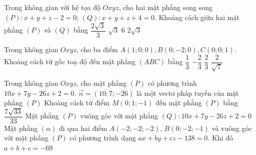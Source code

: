\begin{ex}%
	Trong không gian với hệ tọa độ $Oxyz$, cho  hai mặt phẳng song song $(P)\colon x+y+z-2=0$; $(Q)\colon x+y+z+4=0$. Khoảng cách giữa hai mặt phẳng $(P)$ và $(Q)$ bằng
	 \choice
		{$\dfrac{2\sqrt{3}}{3}$} 
		 {$\sqrt{3}$}
		 {$6$}
		{\True $2\sqrt{3}$} 
\end{ex}

\begin{ex}%
	Trong không gian $Oxyz$, cho ba điểm $A(1;0;0), B(0;-2;0), C(0;0; 1)$. Khoảng cách từ gốc  toạ độ đến mặt phẳng $(ABC)$ bằng
	 \choice
		 {$\dfrac{1}{3}$}
		 {$-\dfrac{2}{3}$}
		{\True $\dfrac{2}{3}$} 
		{$\dfrac{2}{\sqrt{7}}$} 
\end{ex}



\begin{ex}%
	Trong không gian $Oxyz$, cho mặt phẳng $(P)$  có phương trình $10x + 7y - 26z + 2 = 0$.
	\choiceTF 
		{\True $\overrightarrow{n} = \left( 10; 7; -26 \right)$ là một vectơ pháp tuyến của mặt phẳng $(P)$} 
		{\True Khoảng cách từ  điểm $M\left( 0;1;-1 \right)$ đến mặt phẳng $(P)$ bằng $\dfrac{7\sqrt{33}}{33}$}
		{Mặt phẳng $(P)$ vuông  góc với mặt phẳng $(Q)\colon 10x + 7y - 26z + 2 = 0$}
		{Mặt phẳng $(\alpha)$ đi qua hai điểm $A\left( -2;-2;-2 \right)$, $B\left( 0;-2;-1 \right)$ và vuông góc với mặt phẳng $(P)$  có phương trình dạng $ax + by + cz - 138 = 0$. Khi đó $a + b + c = -69$}
\end{ex}

